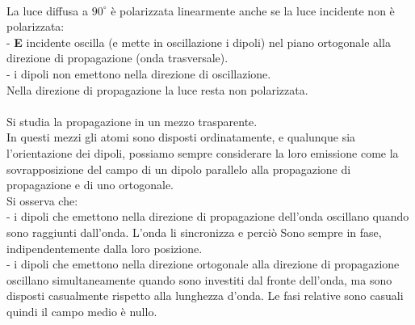 \documentclass{article}
\begin{document}
\\
La luce diffusa a $90^{\circ}$ è polarizzata linearmente anche se la luce incidente non è polarizzata:\\
- \textbf{E} incidente oscilla (e mette in oscillazione i dipoli) nel piano ortogonale alla direzione di propagazione (onda trasversale).\\
- i dipoli non emettono nella direzione di oscillazione.\\
Nella direzione di propagazione la luce resta non polarizzata.\\
\\
Si studia la propagazione in un mezzo trasparente.\\
In questi mezzi gli atomi sono disposti ordinatamente, e qualunque sia l'orientazione dei dipoli, possiamo sempre considerare la loro emissione come la sovrapposizione del campo di un dipolo parallelo alla propagazione di propagazione e di uno ortogonale.\\
Si osserva che:\\
- i dipoli che emettono nella direzione di propagazione dell'onda oscillano quando sono raggiunti dall'onda. L’onda li sincronizza e perciò Sono sempre in fase, indipendentemente dalla loro posizione.\\
- i dipoli che emettono nella direzione ortogonale alla direzione di propagazione oscillano simultaneamente quando sono investiti dal fronte dell'onda, ma sono disposti casualmente rispetto alla lunghezza d’onda. Le fasi relative sono casuali quindi il campo medio è nullo.
\end{document}
